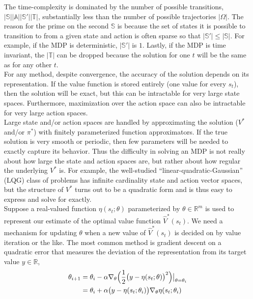 The time-complexity is dominated by the number of possible transitions, $|\mathbb{S}||\mathbb{A}||\mathbb{S}'||\mathbb{T}|$, substantially less than the number of possible trajectories $|\Omega|$. The reason for the prime on the second $\mathbb{S}$ is because the set of states it is possible to transition to from a given state and action is often sparse so that $|\mathbb{S}'| \leq |\mathbb{S}|$. For example, if the MDP is deterministic, $|\mathbb{S}'|$ is $1$. Lastly, if the MDP is time invariant, the $|\mathbb{T}|$ can be dropped because the solution for one $t$ will be the same as for any other $t$.\\

For any method, despite convergence, the accuracy of the solution depends on its representation. If the value function is stored entirely (one value for every $s_t$), then the solution will be exact, but this can be intractable for very large state spaces. Furthermore, maximization over the action space can also be intractable for very large action spaces.\\

Large state and/or action spaces are handled by approximating the solution ($V^*$ and/or $\pi^*$) with finitely parameterized function approximators. If the true solution is very smooth or periodic, then few parameters will be needed to exactly capture its behavior. Thus the difficulty in solving an MDP is not really about how large the state and action spaces are, but rather about how regular the underlying $V^*$ is. For example, the well-studied ``linear-quadratic-Gaussian'' (LQG) class of problems has infinite cardinality state and action vector spaces, but the structure of $V^*$ turns out to be a quadratic form and is thus easy to express and solve for exactly.\\

Suppose a real-valued function $\eta(s_t;\theta)$ parameterized by $\theta \in \mathbb{R}^m$ is used to represent our estimate of the optimal value function $\hat{V}^*(s_t)$. We need a mechanism for updating $\theta$ when a new value of $\hat{V}^*(s_t)$ is decided on by value iteration or the like. The most common method is gradient descent on a quadratic error that measures the deviation of the representation from its target value $y \in \mathbb{R}$,
\begin{align*}
\theta_{i+1} &= \theta_i - \alpha \nabla_{\theta}\Big{(}\dfrac{1}{2}\big{(}y - \eta(s_t;\theta)\big{)}^2\Big{)}\big{|}_{\theta=\theta_i}\\
&= \theta_i + \alpha \big{(}y - \eta(s_t;\theta_i)\big{)}\nabla_{\theta}\eta(s_t;\theta_i)%
\end{align*}

